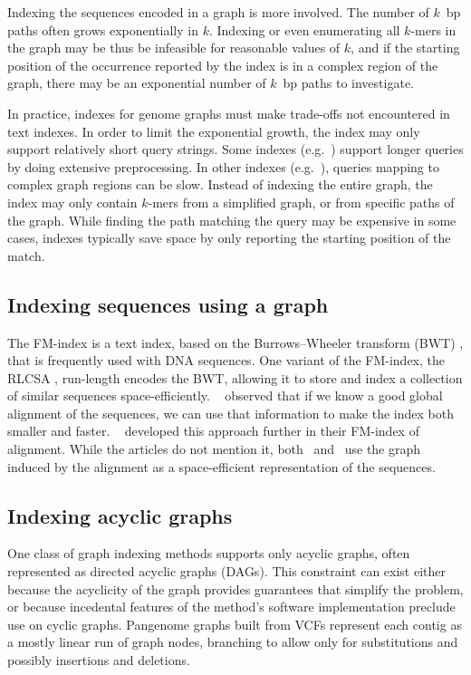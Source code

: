 Indexing the sequences encoded in a graph is more involved.
The number of $k$~bp paths often grows exponentially in $k$.
Indexing or even enumerating all $k$-mers in the graph may be thus be infeasible for reasonable values of $k$, and if the starting position of the occurrence reported by the index is in a complex region of the graph, there may be an exponential number of $k$~bp paths to investigate.

In practice, indexes for genome graphs must make trade-offs not encountered in text indexes.
In order to limit the exponential growth, the index may only support relatively short query strings.
Some indexes (e.g.\ \cite{Siren_2014}) support longer queries by doing extensive preprocessing.
In other indexes (e.g.\ \cite{Thachuk_2013,Huang_2013,Maciuca_2016}), queries mapping to complex graph regions can be slow.
Instead of indexing the entire graph, the index may only contain $k$-mers from a simplified graph, or from specific paths of the graph.
While finding the path matching the query may be expensive in some cases, indexes typically save space by only reporting the starting position of the match.

\subsection{Indexing sequences using a graph}

The FM-index \cite{Ferragina_2005} is a text index, based on the Burrows--Wheeler transform (BWT) \cite{Burrows_1994}, that is frequently used with DNA sequences.
One variant of the FM-index, the RLCSA \cite{Maekinen_2010}, run-length encodes the BWT, allowing it to store and index a collection of similar sequences space-efficiently.
\citeauthor{Huang_2010}\ \cite{Huang_2010} observed that if we know a good global alignment of the sequences, we can use that information to make the index both smaller and faster.
\citeauthor{Na_2016}\ \cite{Na_2016,Na_2018} developed this approach further in their FM-index of alignment.
While the articles do not mention it, both \citeauthor{Huang_2010}\ and \citeauthor{Na_2016}\ use the graph induced by the alignment as a space-efficient representation of the sequences.

\subsection{Indexing acyclic graphs}

One class of graph indexing methods supports only acyclic graphs, often represented as directed acyclic graphs (DAGs).
This constraint can exist either because the acyclicity of the graph provides guarantees that simplify the problem, or because incedental features of the method's software implementation preclude use on cyclic graphs.
Pangenome graphs built from VCFs represent each contig as a mostly linear run of graph nodes, branching to allow only for substitutions and possibly insertions and deletions.

